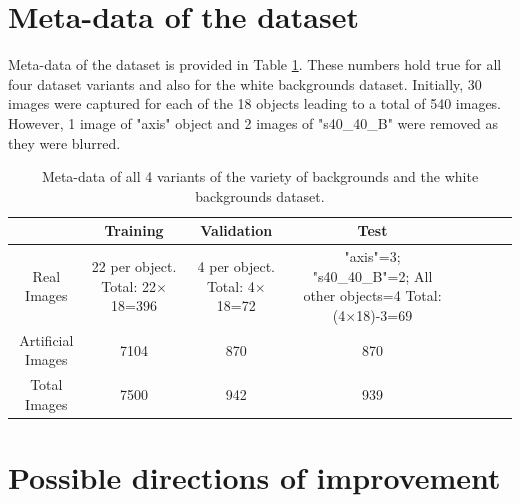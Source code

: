 \section{Meta-data of the dataset}

Meta-data of the dataset is provided in Table \ref{Table:meta}. These numbers hold true for all four dataset variants and also for the white backgrounds dataset. Initially, 30 images were captured for each of the 18 objects leading to a total of 540 images. However, 1 image of "axis" object and 2 images of "s40\_40\_B" were removed as they were blurred.

\begin{table}
	\centering
	\begin{tabular}{|c|c|c|c|c|c|c|c|}
	\hline 
    & Training & Validation & Test \\ 
	\hline 
	Real Images & \makecell{22 per object.\\ Total: 22$\times$18=396} & \makecell{4 per object.\\ Total: 4$\times$18=72} & 				\makecell{"axis"=3; \\"s40\_40\_B"=2; \\All other objects=4\\ Total: (4$\times$18)-3=69} \\ 
	\hline 
	Artificial Images & 7104 & 870 & 870 \\ 
	\hline 
	Total Images & 7500 & 942 & 939 \\ 
	\hline 
	\end{tabular}
	\caption{Meta-data of all 4 variants of the variety of backgrounds and the white backgrounds dataset.}
	\label{Table:meta}
\end{table}

\section{Possible directions of improvement}


